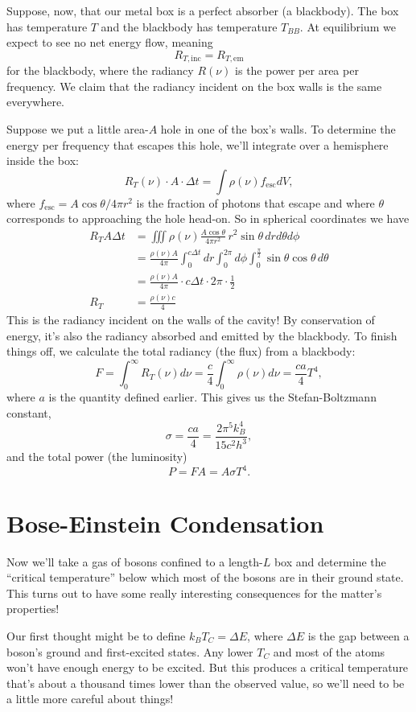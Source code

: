 \documentclass[../p052main.tex]{subfiles}
\begin{document}
Suppose, now, that our metal box is a perfect absorber (a blackbody).
The box has temperature $T$ and the blackbody has temperature $T_{BB}$.
At equilibrium we expect to see no net energy flow, meaning
\[ R_{T,\textrm{inc}} = R_{T,\textrm{em}} \]
for the blackbody, where the radiancy $R(\nu)$ is the power per area per frequency.
We claim that the radiancy incident on the box walls is the same everywhere.

Suppose we put a little area-$A$ hole in one of the box's walls.
To determine the energy per frequency that escapes this hole, we'll integrate over a hemisphere inside the box:
\[ R_T(\nu) \cdot A \cdot \Delta t = \int \rho (\nu) f_\textrm{esc} dV, \]
where $f_\text{esc} = A \cos \theta / 4\pi r^2$ is the fraction of photons that escape and where $\theta$ corresponds to approaching the hole head-on.
So in spherical coordinates we have
\begin{align*}
    R_T A \Delta t &= \iiint \rho(\nu) \frac{A \cos \theta}{4\pi r^2} \,r^2\sin\theta \,dr d\theta d\phi \\
    &= \frac{\rho(\nu) A}{4\pi} \int_{0}^{c\Delta t} dr \int_{0}^{2\pi} d\phi \int_{0}^{\frac{\pi}{2}} \sin\theta \cos\theta \,d\theta \\
    &= \frac{\rho(\nu) A}{4\pi} \cdot c \Delta t \cdot 2\pi \cdot \frac{1}{2} \\
    R_T &= \frac{\rho(\nu)c}{4}
\end{align*}
This is the radiancy incident on the walls of the cavity!
By conservation of energy, it's also the radiancy absorbed and emitted by the blackbody.
To finish things off, we calculate the total radiancy (the flux) from a blackbody:
\[ F = \int_{0}^{\infty} R_T(\nu) d\nu = \frac{c}{4} \int_{0}^{\infty} \rho(\nu) d\nu = \frac{ca}{4} T^{4}, \]
where $a$ is the quantity defined earlier.
This gives us the Stefan-Boltzmann constant,
\[ \sigma = \frac{ca}{4} = \frac{2\pi^{5} k_B^{4}}{15c^2 h^3}, \]
and the total power (the luminosity)
\[ P = FA = A\sigma T^{4}. \]

\section{Bose-Einstein Condensation}
Now we'll take a gas of bosons confined to a length-$L$ box and determine the ``critical temperature'' below which most of the bosons are in their ground state.
This turns out to have some really interesting consequences for the matter's properties!

Our first thought might be to define $k_B T_C = \Delta E$, where $\Delta E$ is the gap between a boson's ground and first-excited states.
Any lower $T_C$ and most of the atoms won't have enough energy to be excited.
But this produces a critical temperature that's about a thousand times lower than the observed value, so we'll need to be a little more careful about things!
\end{document}
